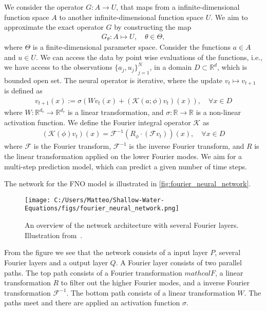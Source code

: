 We consider the operator $G: A \to U$, that maps from a infinite-dimensional function space $A$ to another infinite-dimensional function space $U$.
We aim to approximate the exact operator $G$ by constructing the map
\begin{align*}
    G_{\theta}: A \mapsto U, \quad \theta \in \Theta,
\end{align*} 
where $\Theta$ is a finite-dimensional parameter space.
Consider the functions $a \in A$ and $u \in U$.
We can access the data by point wise evaluations of the functions, i.e., we have access to the observations ${\{a_j, u_j \}}_{j=1}^N$, in a domain $D \subset \mathbb{R}^d$, which is bounded open set.
The neural operator is iterative, where the update $v_t \mapsto v_{t+1}$ is defined as
\begin{align}
    v_{t+1}(x) := \sigma \left( W v_t(x) + \left( \mathcal{K}(a;\phi)v_t \right) (x) \right), \quad \forall x \in D
\end{align}
where $W: \mathbb{R}^{d_v} \to \mathbb{R}^{d_v}$ is a linear transformation, and $\sigma: \mathbb{R} \to \mathbb{R}$ is a non-linear activation function.
We define the Fourier integral operator $\mathcal{K}$ as 
\begin{align}
    \left( \mathcal{K}(\phi)v_t \right) (x) = \mathcal{F}^{-1} \left( R_{\phi} \cdot (\mathcal{F}v_t ) \right)(x), \quad \forall x \in D
\end{align}
where $\mathcal{F}$ is the Fourier transform, $\mathcal{F}^{-1}$ is the inverse Fourier transform, and $R$ is the linear transformation applied on the lower Fourier modes. 
We aim for a multi-step prediction model, which can predict a given number of time steps.

The network for the FNO model is illustrated in \autoref{fig:fourier_neural_network}.
\begin{figure}[H]
    \centering
    \texttt{[image: C:/Users/Matteo/Shallow-Water-Equations/figs/fourier\_neural\_network.png]}
    \caption{An overview of the network architecture with several Fourier layers. Illustration from~\cite{FNO_2021}.}\label{fig:fourier_neural_network}
\end{figure}
From the figure we see that the network consists of a input layer $P$, several Fourier layers and a output layer $Q$.
A Fourier layer consists of two parallel paths. The top path consists of a Fourier transformation $mathcal{F}$, a linear transformation $R$ to filter out the higher Fourier modes, and a inverse Fourier transformation $\mathcal{F}^{-1}$.
The bottom path consists of a linear transformation $W$. 
The paths meet and there are applied an activation function $\sigma$.



